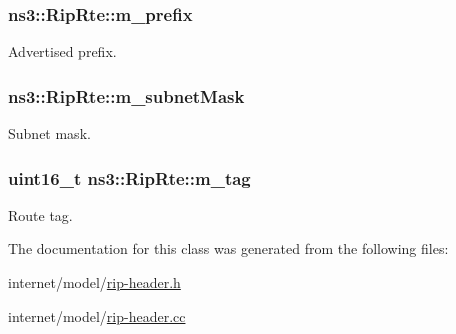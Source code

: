 \subsubsection[{\texorpdfstring{m\+\_\+prefix}{m_prefix}}]{ ns3\+::\+Rip\+Rte\+::m\+\_\+prefix\hspace{0.3cm}{\ttfamily [private]}}\hypertarget{classns3_1_1RipRte_a12719ecd898e44211875a9300b90ee48}{}\label{classns3_1_1RipRte_a12719ecd898e44211875a9300b90ee48}


Advertised prefix. 

\subsubsection[{\texorpdfstring{m\+\_\+subnet\+Mask}{m_subnetMask}}]{ ns3\+::\+Rip\+Rte\+::m\+\_\+subnet\+Mask\hspace{0.3cm}{\ttfamily [private]}}\hypertarget{classns3_1_1RipRte_a18df7fed0765990054dfb50c13d45ecf}{}\label{classns3_1_1RipRte_a18df7fed0765990054dfb50c13d45ecf}


Subnet mask. 

\subsubsection[{\texorpdfstring{m\+\_\+tag}{m_tag}}]{\setlength{\rightskip}{0pt plus 5cm}uint16\+\_\+t ns3\+::\+Rip\+Rte\+::m\+\_\+tag\hspace{0.3cm}{\ttfamily [private]}}\hypertarget{classns3_1_1RipRte_a3556685480286d998bef7ba75a91be53}{}\label{classns3_1_1RipRte_a3556685480286d998bef7ba75a91be53}


Route tag. 



The documentation for this class was generated from the following files\+:\begin{DoxyCompactItemize}
\item 
internet/model/\hyperlink{rip-header_8h}{rip-\/header.\+h}\item 
internet/model/\hyperlink{rip-header_8cc}{rip-\/header.\+cc}\end{DoxyCompactItemize}
